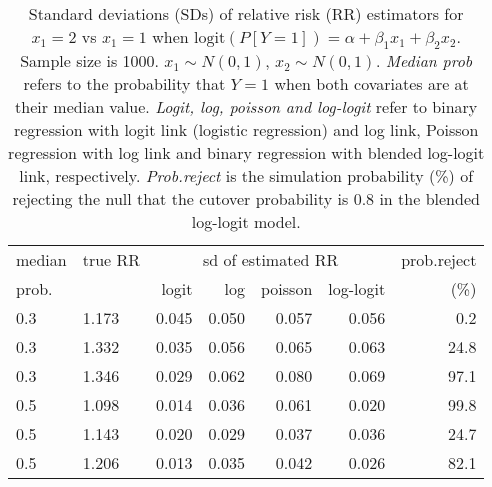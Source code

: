 \documentclass[12pt,a4paper]{article}
\begin{document}
\begin{table}[H] 
\small\sf\centering 
\caption{Standard deviations (SDs) of relative risk (RR) estimators for $x_1=2$ vs $x_1=1$ when $\mbox{logit}(P[Y=1])=\alpha+\beta_1 x_1 + \beta_2 x_2$. Sample size is 1000. $x_1 \sim $$N(0,1)$, $x_2 \sim N(0,1)$. {\it Median prob} refers to the probability that $Y=1$ when both covariates are at their median value. {\it Logit, log, poisson and log-logit} refer to binary regression with logit link (logistic regression) and log link, Poisson regression with log link and binary regression with blended log-logit link, respectively. {\it Prob.reject} is the simulation probability (\%) of rejecting the null that the cutover probability is $0.8$ in the blended log-logit model.} 
\begin{tabular}{llrrrrr} 
\toprule 
median & true RR & \multicolumn{4}{c}{sd of estimated RR} & prob.reject \\ 
prob. & & logit & log & poisson & log-logit  & (\%) \\ \midrule 
0.3 & 1.173 & 0.045 & 0.050 & 0.057 & 0.056 &  0.2 \\  
0.3 & 1.332 & 0.035 & 0.056 & 0.065 & 0.063 & 24.8 \\  
0.3 & 1.346 & 0.029 & 0.062 & 0.080 & 0.069 & 97.1 \\  
0.5 & 1.098 & 0.014 & 0.036 & 0.061 & 0.020 & 99.8 \\  
0.5 & 1.143 & 0.020 & 0.029 & 0.037 & 0.036 & 24.7 \\  
0.5 & 1.206 & 0.013 & 0.035 & 0.042 & 0.026 & 82.1 \\  
\bottomrule 
\end{tabular} 
\end{table} 
\end{document}
